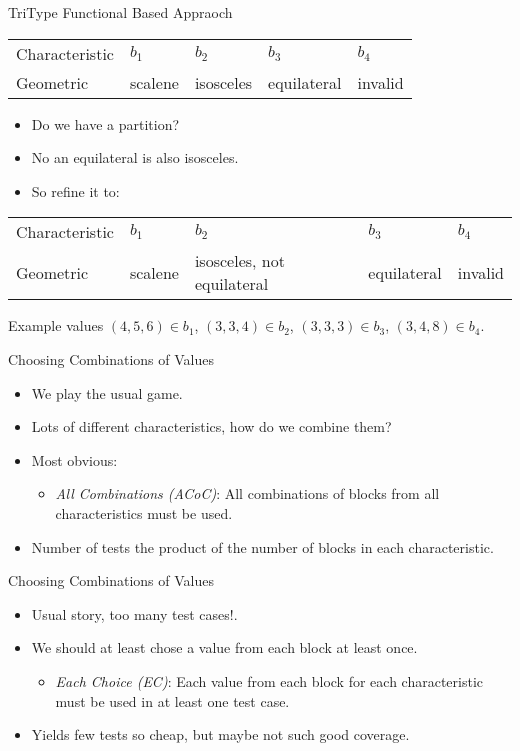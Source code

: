 \documentclass{beamer}
\begin{document}
\begin{frame}{TriType  Functional Based Appraoch}
  \begin{tabular}{||l|l|l|l|l||}\hline 
    Characteristic & $b_1$  & $b_2$ & $b_3$ & $b_4$\\
    Geometric  &  scalene & isosceles &
    equilateral & invalid \\
    \hline
  \end{tabular}
  \begin{itemize}
  \item Do we have a partition? 
  \item No an equilateral is also isosceles.
  \item So refine it to:
  \end{itemize}
{\small
  \begin{tabular}{||l|l|l|l|l||}\hline 
    Characteristic & $b_1$  & $b_2$ & $b_3$ & $b_4$\\
    Geometric  &  scalene & isosceles, not equilateral &
    equilateral & invalid \\
    \hline
  \end{tabular}
}
Example values $(4,5,6) \in b_1$,  $(3,3,4) \in b_2$, $(3,3,3) \in
b_3$, $(3,4,8) \in b_4$.
\end{frame}
\begin{frame}{Choosing Combinations of Values}

  \begin{itemize}
  \item We play the usual game.
  \item Lots of different characteristics, how do we combine them?
  \item Most obvious:
    \begin{itemize}
    \item {\em All Combinations (ACoC)}: All combinations of blocks from all
      characteristics must be used.
    \end{itemize}
  \item Number of tests  the product of the number of blocks in each
    characteristic. 
  \end{itemize}
  \end{frame}
\begin{frame}{Choosing Combinations of Values}
  \begin{itemize}
  \item Usual story, too many test cases!.
  \item We should at least chose a value from each block at least once.
    \begin{itemize}
    \item {\em Each Choice (EC)}: Each value from each block for each
      characteristic must be used in at least one test case.
    \end{itemize}
  \item Yields few tests so cheap, but maybe not such good coverage.
  \end{itemize}
\end{frame}
\end{document}
